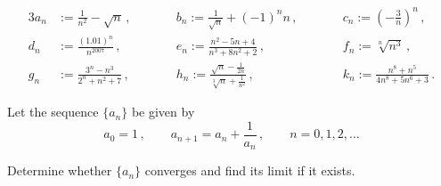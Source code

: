 \documentclass[week=3]{homework}
\begin{document}
\begin{questions}
	    \begin{alignat*}{3}
	    a_n &:= \frac{1}{n^2} - \sqrt n\,,  \qquad &&b_n := \frac{1}{\sqrt n } + (-1)^nn\,,\qquad &&c_n := \left(-\frac{3}{n}\right)^n\,, \\
	    d_n &:= \frac{(1.01)^n}{n^{2007}}\,, \qquad &&e_n := \frac{n^2-5n+4}{n^3+8n^2+2}\,, \qquad &&f_n := \sqrt[n]{n^3}\,, \\
	    g_n &:= \frac{3^n - n^3}{2^n + n^2 + 7}\,, \qquad &&h_n := \frac{\sqrt n - \frac{1}{2n}}{\sqrt[3]{n} + \frac{1}{n^2}}\,, \qquad &&k_n := \frac{n^8 + n^5}{4n^8 + 5n^6 + 3}\,.
	    \end{alignat*}
	    \begin{parts}
	    	\part
	    	
	    	\part
	    	
	    \end{parts}
    
	    \question Let the sequence $\{a_n\}$ be given by
	    \[
		    a_0 = 1\,, \qquad a_{n+1} = a_n + \frac{1}{a_n}\,, \qquad n = 0,1,2,\ldots
	    \]
	    
	    Determine whether $\{a_n\}$ converges and find its limit if it exists.
	    
     \end{questions}
\end{document}
